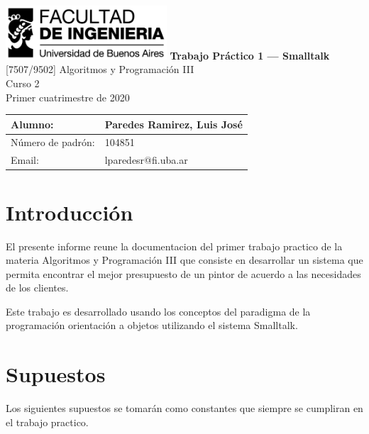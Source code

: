 \documentclass[titlepage,a4paper]{article}
\begin{document}
\begin{titlepage} %
	\hfill\includegraphics[width=6cm]{logofiuba.jpg}
    \centering
    \vfill
    \Huge \textbf{Trabajo Práctico 1 — Smalltalk}
    \vskip2cm
    \Large [7507/9502] Algoritmos y Programación III\\
    Curso 2 \\ %
    Primer cuatrimestre de 2020 
    \vfill
    \begin{tabular}{ | l | l | } %
      \hline
      Alumno: & Paredes Ramirez, Luis José\\ \hline
      Número de padrón: & 104851 \\ \hline
      Email: & lparedesr@fi.uba.ar \\ \hline
  	\end{tabular}
    \vfill
    \vfill
\end{titlepage}

\tableofcontents %
\newpage

\section{Introducción}\label{sec:intro}
  El presente informe reune la documentacion del primer trabajo practico de la materia
  Algoritmos y Programación III que consiste en desarrollar un sistema que permita encontrar el mejor 
  presupuesto de un pintor de acuerdo a las necesidades de los clientes. \newline

  Este trabajo es desarrollado usando los conceptos del paradigma de la programación orientación a objetos
  utilizando el sistema Smalltalk.


\section{Supuestos}\label{sec:supuestos}

Los siguientes supuestos se tomarán como constantes que siempre se cumpliran en el trabajo practico.
\end{document}
